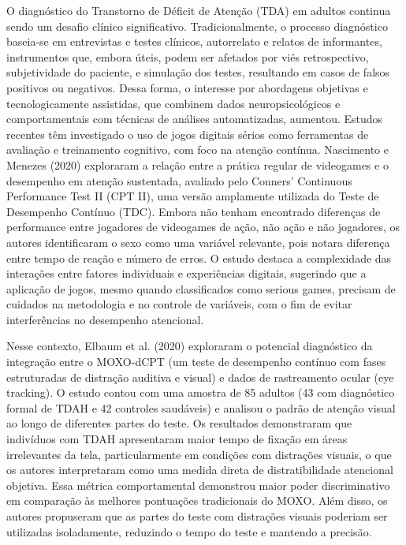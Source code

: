 O diagnóstico do Transtorno de Déficit de Atenção (TDA) em adultos continua sendo
um desafio clínico significativo. Tradicionalmente, o processo diagnóstico baseia-se em
entrevistas e testes clínicos, autorrelato e relatos de informantes, instrumentos que, embora
úteis, podem ser afetados por viés retrospectivo, subjetividade do paciente, e simulação dos
testes, resultando em casos de falsos positivos ou negativos. Dessa forma, o interesse por
abordagens objetivas e tecnologicamente assistidas, que combinem dados neuropsicológicos
e comportamentais com técnicas de análises automatizadas, aumentou. Estudos recentes
têm investigado o uso de jogos digitais sérios como ferramentas de avaliação e treinamento
cognitivo, com foco na atenção contínua. Nascimento e Menezes (2020) exploraram a relação
entre a prática regular de videogames e o desempenho em atenção sustentada, avaliado
pelo Conners’ Continuous Performance Test II (CPT II), uma versão amplamente utilizada do
Teste de Desempenho Contínuo (TDC). Embora não tenham encontrado diferenças de
performance entre jogadores de videogames de ação, não ação e não jogadores, os autores
identificaram o sexo como uma variável relevante, pois notara diferença entre tempo de
reação e número de erros. O estudo destaca a complexidade das interações entre fatores
individuais e experiências digitais, sugerindo que a aplicação de jogos, mesmo quando
classificados como serious games, precisam de cuidados na metodologia e no controle de
variáveis, com o fim de evitar interferências no desempenho atencional.

Nesse contexto, Elbaum et al. (2020) exploraram o potencial diagnóstico da integração
entre o MOXO-dCPT (um teste de desempenho contínuo com fases estruturadas de distração
auditiva e visual) e dados de rastreamento ocular (eye tracking). O estudo contou com uma
amostra de 85 adultos (43 com diagnóstico formal de TDAH e 42 controles saudáveis) e
analisou o padrão de atenção visual ao longo de diferentes partes do teste. Os resultados
demonstraram que indivíduos com TDAH apresentaram maior tempo de fixação em áreas
irrelevantes da tela, particularmente em condições com distrações visuais, o que os autores
interpretaram como uma medida direta de distratibilidade atencional objetiva. Essa métrica
comportamental demonstrou maior poder discriminativo em comparação às melhores
pontuações tradicionais do MOXO. Além disso, os autores propuseram que as partes do teste
com distrações visuais poderiam ser utilizadas isoladamente, reduzindo o tempo do teste e
mantendo a precisão.


